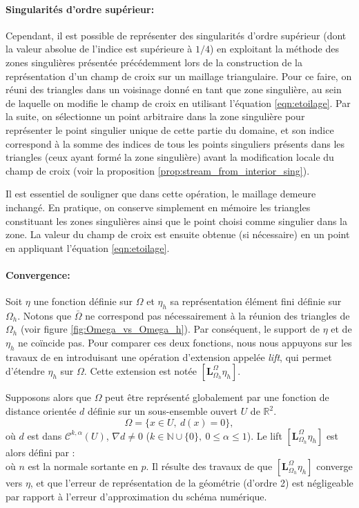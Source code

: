 \paragraph{Singularités d'ordre supérieur:} Cependant, il est possible de représenter des singularités d'ordre supérieur (dont la valeur absolue de l'indice est supérieure à $1/4$) en exploitant la méthode des zones singulières présentée précédemment lors de la construction de la représentation d'un champ de croix sur un maillage triangulaire. Pour ce faire, on réuni des triangles dans un voisinage donné en tant que zone singulière, au sein de laquelle on modifie le champ de croix en utilisant l'équation \eqref{eqn:etoilage}. Par la suite, on sélectionne un point arbitraire dans la zone singulière pour représenter le point singulier unique de cette partie du domaine, et son indice correspond à la somme des indices de tous les points singuliers présents dans les triangles (ceux ayant formé la zone singulière) avant la modification locale du champ de croix (voir la proposition \ref{prop:stream_from_interior_sing}).

Il est essentiel de souligner que dans cette opération, le maillage demeure inchangé. En pratique, on conserve simplement en mémoire les triangles constituant les zones singulières ainsi que le point choisi comme singulier dans la zone. La valeur du champ de croix est ensuite obtenue (si nécessaire) en un point en appliquant l'équation \eqref{eqn:etoilage}.

\paragraph{Convergence:}
Soit $\eta$ une fonction définie sur $\Omega$ et $\eta_h$ sa représentation élément fini définie sur $\Omega_h$. Notons que $\bar{\Omega}$ ne correspond pas nécessairement à la réunion des triangles de $\Omega_h$ (voir figure \ref{fig:Omega_vs_Omega_h}). Par conséquent, le support de $\eta$ et de $\eta_h$ ne coïncide pas. Pour comparer ces deux fonctions, nous nous appuyons sur les travaux de \cite{dziuk1988finite} en introduisant une opération d'extension appelée \emph{lift}, qui permet d'étendre $\eta_h$ sur $\Omega$. Cette extension est notée $[\mathbf{L}_{\Omega_h}^{\Omega}\eta_h]$.

Supposons alors que $\Omega$ peut être représenté globalement par une fonction de distance orientée $d$ définie sur un sous-ensemble ouvert $U$ de $\mathbb{R}^2$.
\[
\Omega=\{x\in U,~d(x)=0\},
\]
où $d$ est dans $\mathcal{C}^{k,\alpha}(U)$, $\nabla d\neq 0$ ($k\in\mathbb{N}\cup\{0\},~0\leq\alpha\leq 1$). Le lift $[\mathbf{L}_{\Omega_h}^{\Omega}\eta_h]$ est alors défini par :
\begin{equation}
\end{equation}
où $n$ est la normale sortante en $p$. Il résulte des travaux de \cite{dziuk1988finite} que $[\mathbf{L}_{\Omega_h}^{\Omega}\eta_h]$ converge vers $\eta$, et que l'erreur de représentation de la géométrie (d'ordre 2) est négligeable par rapport à l'erreur d'approximation du schéma numérique.


